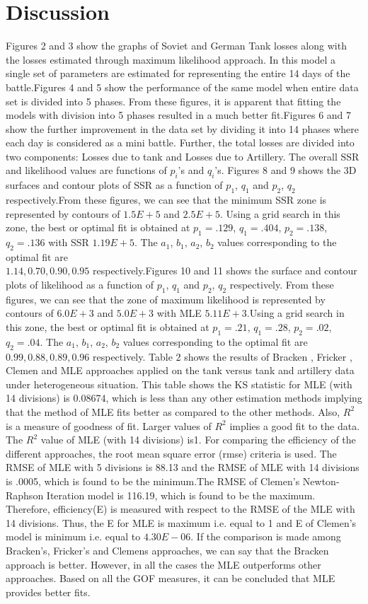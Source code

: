 \documentclass[]{article}
\begin{document}
\section{Discussion}
Figures 2 and 3 show the graphs of Soviet and German Tank losses along with the losses estimated through maximum likelihood approach. In this model a single set of parameters are estimated for representing the entire 14 days of the battle.Figures 4 and 5 show the performance of the same model when entire data set is divided into 5 phases. From these figures, it is apparent that fitting the models with division into 5 phases resulted in a much better fit.Figures 6 and 7 show the further improvement in the data set by dividing it into 14 phases where each day is considered as a mini battle. Further, the total losses are divided into two components: Losses due to tank and Losses due to Artillery. The overall SSR and likelihood values are functions of $p_i$’s and $q_i$’s. Figures 8 and 9 shows the 3D surfaces and contour plots of SSR as a function of $p_1$, $q_1$ and $p_2$, $q_2$ respectively.From these figures, we can see that the minimum SSR zone is represented by contours of $1.5E+5$ and $2.5E+5$. Using a grid search in this zone, the best or optimal fit is obtained at $p_1=.129$, $q_1=.404$, $p_2=.138$, $q_2=.136$ with SSR $1.19E+5$. The $a_1$, $b_1$, $a_2$, $b_2$ values corresponding to the optimal fit are\\ $1.14, 0.70, 0.90, 0.95$ respectively.Figures 10 and 11 shows the surface and contour plots of likelihood as a function of $p_1$, $q_1$ and $p_2$, $q_2$ respectively. From these figures, we can see that the zone of maximum likelihood is represented by contours of $6.0E+3$ and $5.0E+3$ with MLE $5.11E+3$.Using a grid search in this zone, the best or optimal fit is obtained at $p_1=.21$, $q_1=.28$, $p_2=.02$, $q_2=.04$. The $a_1$, $b_1$, $a_2$, $b_2$ values corresponding to the optimal fit are $0.99, 0.88, 0.89, 0.96$ respectively.
Table 2 shows the results of Bracken \autocite{Bracken:1995}, Fricker \autocite{Fricker:1998} , Clemen \autocite{Clemens:1997}  and MLE approaches applied on the tank versus tank and artillery data under heterogeneous situation. This table shows the KS statistic for MLE (with 14 divisions) is 0.08674, which is less than any other estimation methods implying that the method of MLE fits better as compared to the other methods. Also, $R^2$ is a measure of goodness of fit. Larger values of $R^2$ implies a good fit to the data. The $R^2$ value of MLE (with 14 divisions) is1. For comparing the efficiency of the different approaches, the root mean square error (\acrshort{rmse}) criteria is used. The RMSE of MLE with 5 divisions is 88.13 and the RMSE of MLE with 14 divisions is .0005, which is found to be the minimum.The RMSE of Clemen’s Newton-Raphson Iteration model is 116.19, which is found to be the maximum. Therefore, efficiency(E) is measured with respect to the RMSE of the MLE with 14 divisions. Thus, the E for MLE is maximum i.e. equal to 1 and E of Clemen’s model is minimum i.e. equal to $4.30E-06$. If the comparison is made among Bracken's, Fricker's and Clemens approaches, we can say that the Bracken approach is better. However, in all the cases the MLE outperforms other approaches. Based on all the GOF measures, it can be concluded that MLE provides better fits.
\end{document}
